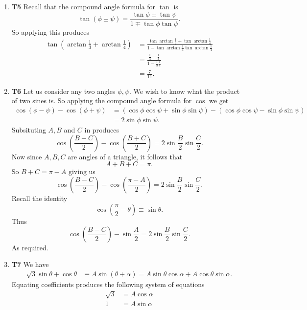 \documentclass[12pt,oneside]{book}
\begin{document}
\begin{enumerate}
        \item \textbf{T5} Recall that the compound angle formula for $\tan$ is \[
            \tan (\phi \pm \psi) = \frac{\tan \phi \pm \tan \psi}{1 \mp \tan \phi \tan \psi}
        .\]  So applying this produces \begin{align*}
            \tan \left(\arctan \frac{1}{3} + \arctan \frac{1}{4}\right) &= \frac{\tan \arctan \frac{1}{3} + \tan \arctan \frac{1}{4}}{1 - \tan \arctan \frac{1}{3} \tan \arctan \frac{1}{4}} \\
            &= \frac{\frac{1}{3} + \frac{1}{4}}{1 - \frac{1}{3} \frac{1}{4}} \\
            &= \frac{7}{11}.
        \end{align*}
        \item \textbf{T6} Let us consider any two angles $\phi, \psi$. We wish to know what the product of two sines is. So applying the compound angle formula for $\cos$ we get \begin{align*}
            \cos(\phi - \psi) - \cos (\phi + \psi) &= \left( \cos \phi \cos \psi + \sin \phi \sin \psi \right) - \left( \cos \phi \cos \psi - \sin \phi \sin \psi \right) \\
            &= 2 \sin \phi \sin \psi.
        \end{align*}
        Subsituting $A, B$ and $C$ in produces \[
            \cos \left( \frac{B - C}{2} \right) - \cos \left( \frac{B + C}{2} \right) = 2 \sin \frac{B}{2} \sin \frac{C}{2}
        .\] Now since $A,B, C$ are angles of a triangle, it follows that \[
            A + B + C = \pi
        .\] So $B + C = \pi - A$ giving us \[
            \cos \left( \frac{B - C}{2} \right) - \cos \left( \frac{\pi - A}{2} \right) = 2 \sin \frac{B}{2} \sin \frac{C}{2}
        .\] Recall the identity \[
            \cos \left(\frac{\pi}{2} - \theta\right) \equiv \sin \theta
        .\] Thus \[
            \cos \left( \frac{B - C}{2} \right) - \sin \frac{A}{2} = 2 \sin \frac{B}{2} \sin \frac{C}{2}
        .\] 
        As required.
        \item \textbf{T7} We have \begin{align*}
            \sqrt{3}\sin \theta + \cos \theta &\equiv A \sin(\theta + \alpha) = A \sin \theta \cos \alpha + A \cos \theta \sin \alpha.
        \end{align*} Equating coefficients produces the following system of equations \begin{align*}
            \sqrt{3} &= A \cos \alpha \\
            1 &= A \sin \alpha

\end{align*}
\end{enumerate}
\end{document}
